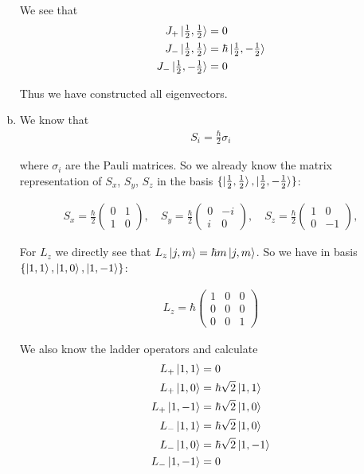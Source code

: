 \documentclass[a4paper,german,12pt,smallheadings]{scrartcl}
\begin{document}
\begin{enumerate}[a)]
    We see that
    \begin{align*}
      J_+ \ket{\tfrac{1}{2}, \tfrac{1}{2}} &= 0 \\
      J_- \ket{\tfrac{1}{2}, \tfrac{1}{2}} &= \hbar \ket{\tfrac{1}{2}, -\tfrac{1}{2}} \\
      J_- \ket{\tfrac{1}{2}, -\tfrac{1}{2}} &= 0
    \end{align*}

    Thus we have constructed all eigenvectors.

  \item
    We know that
    \begin{align*}
      S_i = \frac{\hbar}{2} \sigma_i
    \end{align*}

    where $\sigma_i$ are the Pauli matrices. So we already know the matrix
    representation of $S_x$, $S_y$, $S_z$ in the basis $\{\ket{\tfrac{1}{2},
    \tfrac{1}{2}}, \ket{\tfrac{1}{2}, -\tfrac{1}{2}}\}$:

    \begin{align*}
      S_x = \frac{\hbar}{2} \begin{pmatrix}
        0 & 1 \\
        1 & 0
      \end{pmatrix}, \quad
      S_y = \frac{\hbar}{2} \begin{pmatrix}
        0 & -i \\
        i & 0
      \end{pmatrix}, \quad
      S_z = \frac{\hbar}{2} \begin{pmatrix}
        1 & 0 \\
        0 & -1
      \end{pmatrix},
    \end{align*}

    For $L_z$ we directly see that $L_z \ket{j, m} = \hbar m \ket{j,m}$. So we
    have in basis $\{\ket{1,1}, \ket{1,0}, \ket{1,-1}\}$:

    \begin{align*}
      L_z = \hbar \begin{pmatrix}
        1 & 0 & 0 \\
        0 & 0 & 0 \\
        0 & 0 & 1
      \end{pmatrix}
    \end{align*}

    We also know the ladder operators and calculate
    \begin{align*}
      L_+ \ket{1,1} &= 0 \\
      L_+ \ket{1,0} &= \hbar \sqrt{2} \ket{1,1} \\
      L_+ \ket{1,-1} &= \hbar \sqrt{2} \ket{1,0} \\
      L_- \ket{1,1} &= \hbar \sqrt{2} \ket{1,0} \\
      L_- \ket{1,0} &= \hbar \sqrt{2} \ket{1,-1} \\
      L_- \ket{1,-1} &= 0 \\
    \end{align*}


\end{enumerate}
\end{document}
